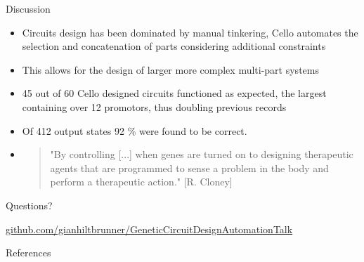 \documentclass[10pt]{beamer}
\begin{document}
\begin{frame}{Discussion}
  \begin{itemize}[<+- | alert@+>]
    \item Circuits design has been dominated by manual tinkering, Cello automates the selection and concatenation of parts considering additional constraints
    \item This allows for the design of larger more complex multi-part systems
    \item 45 out of 60 Cello designed circuits functioned as expected, the largest containing over 12 promotors, thus doubling previous records 
    \item Of 412 output states 92 \% were found to be correct.
    \item[] \begin{quote}
        \vspace{0.2cm}
        "By controlling [...] when genes are turned on to designing therapeutic agents that are programmed to sense a problem in the body and perform a therapeutic action." [R. Cloney]
    \end{quote}
  \end{itemize}
  \nocite{Cloney2016SyntheticDesign}
\end{frame}


{
    \begin{frame}[standout]
        \vspace{3cm}
        Questions?
        \vspace{3cm}
        {
            \footnotesize
            \begin{center}\url{github.com/gianhiltbrunner/GeneticCircuitDesignAutomationTalk}\end{center}
            
            \begin{center}\ccbysa\end{center}
        } 
    \end{frame}
}

\appendix

\begin{frame}[allowframebreaks]{References}

  
  

\end{frame}

\begin{frame}{}
    
\end{frame}
\end{document}
